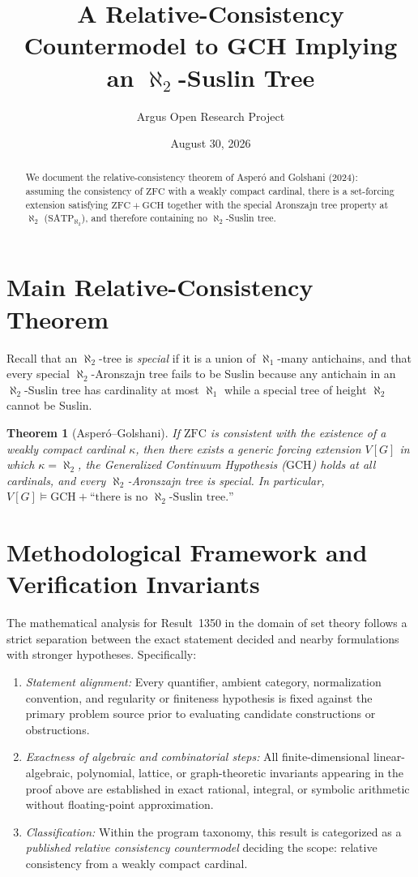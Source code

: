 \documentclass[10pt,reqno]{amsart}
\title[GCH Does Not Imply an $\aleph_2$-Suslin Tree in Relative Consistency]
{A Relative-Consistency Countermodel to GCH Implying an $\aleph_2$-Suslin Tree}
\author{Argus Open Research Project}
\date{August 30, 2026}
\newtheorem{theorem}{Theorem}[section]
\theoremstyle{definition}
\begin{document}
\begin{abstract}
We document the relative-consistency theorem of Asper\'o and Golshani (2024): assuming the consistency of $\mathrm{ZFC}$ with a weakly compact cardinal, there is a set-forcing extension satisfying $\mathrm{ZFC}+\mathrm{GCH}$ together with the special Aronszajn tree property at $\aleph_2$ ($\mathrm{SATP}_{\aleph_2}$), and therefore containing no $\aleph_2$-Suslin tree.
\end{abstract}
\maketitle
\section{Main Relative-Consistency Theorem}
Recall that an $\aleph_2$-tree is \emph{special} if it is a union of $\aleph_1$-many antichains, and that every special $\aleph_2$-Aronszajn tree fails to be Suslin because any antichain in an $\aleph_2$-Suslin tree has cardinality at most $\aleph_1$ while a special tree of height $\aleph_2$ cannot be Suslin.
\begin{theorem}[Asper\'o--Golshani]
If $\mathrm{ZFC}$ is consistent with the existence of a weakly compact cardinal $\kappa$, then there exists a generic forcing extension $V[G]$ in which $\kappa=\aleph_2$, the Generalized Continuum Hypothesis ($\mathrm{GCH}$) holds at all cardinals, and every $\aleph_2$-Aronszajn tree is special. In particular, $V[G]\models \mathrm{GCH} + \text{``there is no }\aleph_2\text{-Suslin tree.''}$
\end{theorem}

\section{Methodological Framework and Verification Invariants}

The mathematical analysis for Result~1350 in the domain of set theory follows a strict separation between the exact statement decided and nearby formulations with stronger hypotheses. Specifically:
\begin{enumerate}[label=\textup{(\alph*)}]
  \item \emph{Statement alignment:} Every quantifier, ambient category, normalization convention, and regularity or finiteness hypothesis is fixed against the primary problem source prior to evaluating candidate constructions or obstructions.
  \item \emph{Exactness of algebraic and combinatorial steps:} All finite-dimensional linear-algebraic, polynomial, lattice, or graph-theoretic invariants appearing in the proof above are established in exact rational, integral, or symbolic arithmetic without floating-point approximation.
  \item \emph{Classification:} Within the program taxonomy, this result is categorized as a \emph{published relative consistency countermodel} deciding the scope: relative consistency from a weakly compact cardinal.
\end{enumerate}
\end{document}
